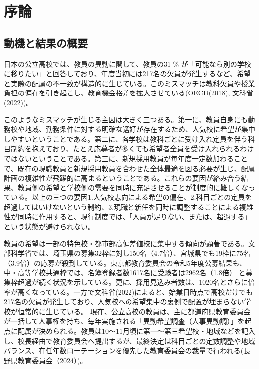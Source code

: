 \documentclass[12pt, a4paper]{article}
\theoremstyle{definition}
\theoremstyle{remark}
\theoremstyle{plain}
\begin{document}
\newpage %

\section{序論}
\subsection{動機と結果の概要}
日本の公立高校では、教員の異動に関して、教員の31 \% が「可能なら別の学校に移りたい」と回答しており、年度当初には217名の欠員が発生するなど、希望と実際の配属の不一致が構造的に生じている。このミスマッチは教科欠員や授業負担の偏在を引き起こし、教育機会格差を拡大させている(OECD(2018), 文科省(2022))。

このようなミスマッチが生じる主因は大きく三つある。第一に、教員自身にも勤務校や地域、勤務条件に対する明確な選好が存在するため、人気校に希望が集中しやすいということである。第二に、各学校は教科ごとに受け入れ定員を伴う科目制約を抱えており、たとえ応募者が多くても希望者全員を受け入れられるわけではないということである。第三に、新規採用教員が毎年度一定数加わることで、既存の現職教員と新規採用教員を合わせた全体最適を図る必要が生じ、配属計画の複雑性が飛躍的に高まるということである。これらの要因が絡み合う結果、教員側の希望と学校側の需要を同時に充足させることが制度的に難しくなっている。以上の三つの要因1.人気校志向による希望の偏在、2.科目ごとの定員を超過してはいけないという制約、3.現職と新任を同時に調整することによる複雑性が同時に作用すると、現行制度では、「人員が足りない、または、超過する」という状態が避けられない。

教員の希望は一部の特色校・都市部高偏差値校に集中する傾向が顕著である。文部科学省では、埼玉県の募集32枠に対し150名（4.7倍）、宮城県でも19枠に75名（3.9倍）の応募が殺到している。東京都教育委員会の令和5年度公募結果も、中・高等学校共通枠では、名簿登録者数1617名に受験者は2962名（1.8倍） と募集枠超過が続く状況を示している。更に、採用見込み者数は、1020名とさらに倍率が高くなっている。一方で文科省(2022)によると、始業日時点で高校だけでも217名の欠員が発生しており、人気校への希望集中の裏側で配置が埋まらない学校が恒常的に生じている。
現在、公立高校の教員は、主に都道府県教育委員会が一括して人事権を持ち、毎年実施される「異動希望調査（人事異動調）」を起点に配属が決められる。教員は10〜11月頃に第一〜第三希望校・地域などを記入し、校長経由で教育委員会へ提出するが、最終決定は科目ごとの定数調整や地域バランス、在任年数ローテーションを優先した教育委員会の裁量で行われる(長野県教育委員会（2024）)。
\end{document}
